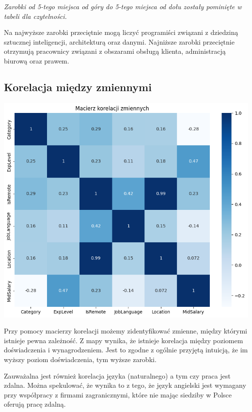 \documentclass{article}
\begin{document}
\textit{Zarobki od 5-tego miejsca od góry do 5-tego miejsca od dołu zostały pominięte w tabeli dla czytelności.}

\medskip

Na najwyższe zarobki przeciętnie mogą liczyć programiści związani z dziedziną sztucznej inteligencji, architekturą oraz danymi.
Najniższe zarobki przeciętnie otrzymują pracownicy związani z obszarami obsługą klienta, administracją biurową oraz prawem.

\subsection{Korelacja między zmiennymi}

\begin{center}
    \includegraphics[scale=0.5]{img/corr_matrix.png}
\end{center}

Przy pomocy macierzy korelacji możemy zidentyfikować zmienne, między którymi
istnieje pewna zależność.
Z mapy wynika, że istnieje korelacja między poziomem doświadczenia i wynagrodzeniem. Jest to zgodne z ogólnie przyjętą intuicją,
że im wyższy poziom doświadczenia, tym wyższe zarobki.

Zauważalna jest również korelacja języka (naturalnego) a tym czy praca jest zdalna.
Można spekulować, że wynika to z tego, że język angielski jest wymagany przy współpracy z firmami zagranicznymi,
które nie mając siedziby w Polsce oferują pracę zdalną.
\end{document}
